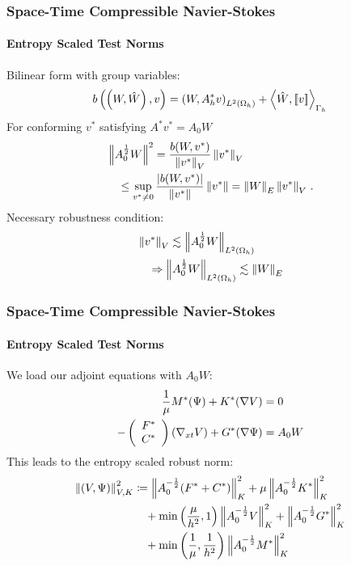 \documentclass[18pt,xcolor=table]{beamer}
\begin{document}
\begin{frame}[t]
\frametitle{Space-Time Compressible Navier-Stokes}
\framesubtitle{Entropy Scaled Test Norms}  %
Bilinear form with group variables:
\[
b\left( \left( W,\hat W \right),v \right) = \left( W,A^*_h v \right)_{L^2\left( \Omega_h \right)} + \left\langle \hat W, \left[ \![v]\! \right] \right\rangle_{\Gamma_h}
\]
For conforming $v^*$ satisfying $A^* v^* = A_0W$
\begin{align*}
&\left\| A_0^\frac{1}{2}W \right\|^2
=\frac{b(W,v^*)}{\left\| v^* \right\|_V} \left\| v^* \right\|_V\\
&\quad\leq\sup_{v^*\neq0}\frac{|b(W,v^*)|}{\left\| v^* \right\|}\left\| v^* \right\|
=\left\| W \right\|_E \left\| v^* \right\|_V\,.
\end{align*}
Necessary robustness condition:
\begin{align*}
&\left\| v^* \right\|_V\lesssim\left\| A_0^\frac{1}{2}W \right\|_{L^2(\Omega_h)}\\
&\quad\Rightarrow\left\| A_0^\frac{1}{2}W \right\|_{L^2(\Omega_h)}\lesssim\left\| W \right\|_E
\end{align*}
\end{frame}


\begin{frame}[t]
\frametitle{Space-Time Compressible Navier-Stokes}
\framesubtitle{Entropy Scaled Test Norms}  %
We load our adjoint equations with $A_0W$:
\begin{align*}
\frac{1}{\mu}M^*(\Psi)+K^*(\nabla V)&=0
\\
-\left( \begin{array}{c} F^*\\ C^*\\ \end{array} \right)(\nabla_{xt} V)+G^*(\nabla\Psi)&=A_0W
\end{align*}
This leads to the entropy scaled robust norm:
\begin{align*}
\left\| \left( V,\Psi \right) \right\|_{V,K}^2 &\coloneqq
\left\| A_0^{-\frac{1}{2}}(F^*+C^*) \right\|_K^2
+ \mu\left\| A_0^{-\frac{1}{2}}K^* \right\|_K^2
\\\nonumber&\quad
+ \min\left( \frac{\mu}{h^2},1 \right)\left\| A_0^{-\frac{1}{2}}V \right\|^2_K
+ \left\| A_0^{-\frac{1}{2}}G^* \right\|_K^2
\\\nonumber&\quad
+ \min\left( \frac{1}{\mu},\frac{1}{h^2} \right)\left\| A_0^{-\frac{1}{2}}M^* \right\|_K^2
\end{align*}
\end{frame}
\end{document}
